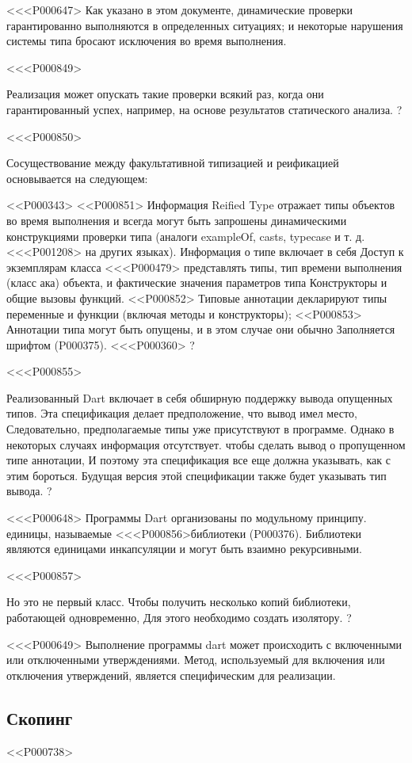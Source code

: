 {{{{{{{{{{{{{{<<<P000647>%
Как указано в этом документе,
динамические проверки гарантированно выполняются в определенных ситуациях;
и некоторые нарушения системы типа бросают исключения во время выполнения.

<<<P000849>{%
Реализация может опускать такие проверки всякий раз, когда они
гарантированный успех, например, на основе результатов статического анализа.
?

<<<P000850>{%
Сосуществование между факультативной типизацией и реификацией
основывается на следующем:

<<P000343>
<<P000851>
Информация Reified Type отражает типы объектов во время выполнения
и всегда могут быть запрошены динамическими конструкциями проверки типа
(аналоги exampleOf, casts, typecase и т. д. <<<P001208> на других языках).
Информация о типе включает в себя
Доступ к экземплярам класса <<<P000479> представлять типы,
тип времени выполнения (класс ака) объекта,
и фактические значения параметров типа
Конструкторы и общие вызовы функций.
<<P000852>
Типовые аннотации декларируют типы
переменные и функции (включая методы и конструкторы);
<<P000853>
Аннотации типа могут быть опущены, и в этом случае они обычно
Заполняется шрифтом \DYNAMIC{}
(P000375).
<<<P000360>%
?

<<<P000855>{%
Реализованный Dart включает в себя обширную поддержку вывода опущенных типов.
Эта спецификация делает предположение, что вывод имел место,
Следовательно, предполагаемые типы уже присутствуют в программе.
Однако в некоторых случаях информация отсутствует.
чтобы сделать вывод о пропущенном типе аннотации,
И поэтому эта спецификация все еще должна указывать, как с этим бороться.
Будущая версия этой спецификации также будет указывать тип вывода.
?

<<<P000648>%
Программы Dart организованы по модульному принципу.
единицы, называемые <<<P000856>{библиотеки} (P000376).
Библиотеки являются единицами инкапсуляции и могут быть взаимно рекурсивными.

<<<P000857>{%
Но это не первый класс.
Чтобы получить несколько копий библиотеки, работающей одновременно,
Для этого необходимо создать изолятору.%
?

<<<P000649>%
Выполнение программы dart может происходить с включенными или отключенными утверждениями.
Метод, используемый для включения или отключения утверждений, является специфическим для реализации.


\subsection{Скопинг}
<<P000738>

}}}}}}}}}}}}}}}}}}
